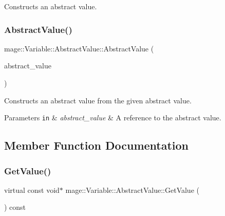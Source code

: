 Constructs an abstract value. \hypertarget{structmage_1_1_variable_1_1_abstract_value_ad6ffb70859701161c192b723bc33d588}{}\label{structmage_1_1_variable_1_1_abstract_value_ad6ffb70859701161c192b723bc33d588} 
\subsubsection{\texorpdfstring{Abstract\+Value()}{AbstractValue()}\hspace{0.1cm}{\footnotesize\ttfamily [2/2]}}
{\footnotesize\ttfamily mage\+::\+Variable\+::\+Abstract\+Value\+::\+Abstract\+Value (\begin{DoxyParamCaption}\item[{const \hyperlink{structmage_1_1_variable_1_1_abstract_value}{Abstract\+Value} \&}]{abstract\+\_\+value }\end{DoxyParamCaption})\hspace{0.3cm}{\ttfamily [protected]}}

Constructs an abstract value from the given abstract value.


\begin{DoxyParams}[1]{Parameters}
\mbox{\tt in}  & {\em abstract\+\_\+value} & A reference to the abstract value. \\
\hline
\end{DoxyParams}


\subsection{Member Function Documentation}
\hypertarget{structmage_1_1_variable_1_1_abstract_value_aede2a77b571b80794a4254e34144f4c1}{}\label{structmage_1_1_variable_1_1_abstract_value_aede2a77b571b80794a4254e34144f4c1} 
\subsubsection{\texorpdfstring{Get\+Value()}{GetValue()}}
{\footnotesize\ttfamily virtual const void$\ast$ mage\+::\+Variable\+::\+Abstract\+Value\+::\+Get\+Value (\begin{DoxyParamCaption}{ }\end{DoxyParamCaption}) const\hspace{0.3cm}{\ttfamily [pure virtual]}}

